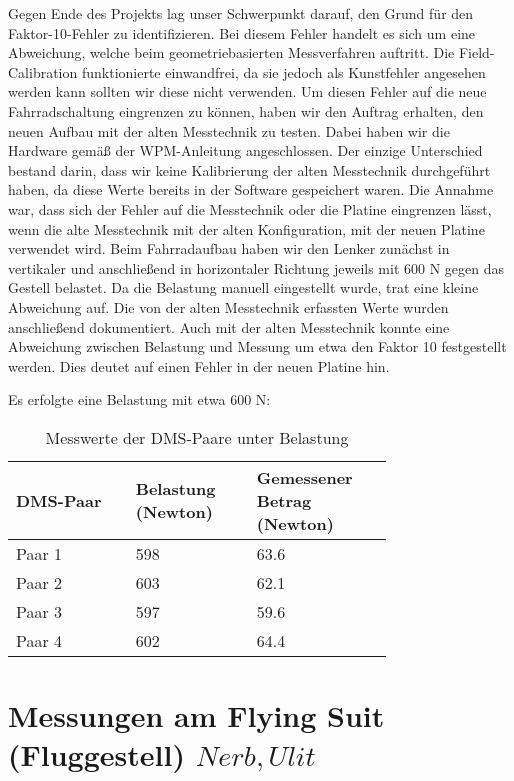 Gegen Ende des Projekts lag unser Schwerpunkt darauf, den Grund für den Faktor-10-Fehler zu identifizieren.
Bei diesem Fehler handelt es sich um eine Abweichung, welche beim geometriebasierten Messverfahren auftritt.
Die Field-Calibration funktionierte einwandfrei, da sie jedoch als Kunstfehler angesehen werden kann sollten wir diese nicht verwenden.
Um diesen Fehler auf die neue Fahrradschaltung eingrenzen zu können, haben wir den Auftrag erhalten, den neuen Aufbau mit der alten Messtechnik zu testen.
Dabei haben wir die Hardware gemäß der WPM-Anleitung angeschlossen. Der einzige Unterschied bestand darin, dass wir keine Kalibrierung der alten Messtechnik durchgeführt haben, da diese Werte bereits in der Software gespeichert waren.
Die Annahme war, dass sich der Fehler auf die Messtechnik oder die Platine eingrenzen lässt, wenn die alte Messtechnik mit der alten Konfiguration,
mit der neuen Platine verwendet wird.
Beim Fahrradaufbau haben wir den Lenker zunächst in vertikaler und anschließend in horizontaler Richtung jeweils mit 600 N gegen das Gestell belastet.
Da die Belastung manuell eingestellt wurde, trat eine kleine Abweichung auf. Die von der alten Messtechnik erfassten Werte wurden anschließend dokumentiert.
Auch mit der alten Messtechnik konnte eine Abweichung zwischen Belastung und Messung um etwa den Faktor 10 festgestellt werden.
Dies deutet auf einen Fehler in der neuen Platine hin.

Es erfolgte eine Belastung mit etwa 600 N:

\begin{table}[h]
    \centering
    \begin{tabular}{|p{0.25\linewidth}|p{0.25\linewidth}|p{0.25\linewidth}|}
    \hline
    \textbf{DMS-Paar} & \textbf{Belastung (Newton)} & \textbf{Gemessener Betrag (Newton)} \\ \hline
    Paar 1 & 598 & 63.6 \\ \hline
    Paar 2 & 603 & 62.1 \\ \hline
    Paar 3 & 597 & 59.6 \\ \hline
    Paar 4 & 602 & 64.4 \\ \hline
    \end{tabular}
    \caption{Messwerte der DMS-Paare unter Belastung}
    \label{tbl:dms_messwerte}
\end{table}





\clearpage
\section{Messungen am Flying Suit (Fluggestell) \(Nerb, Ulit\)}
